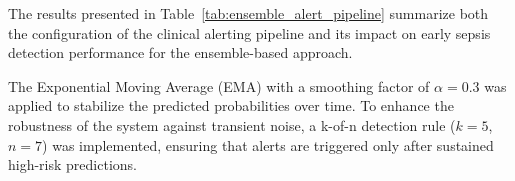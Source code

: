 \documentclass[conference]{IEEEtran}
\begin{document}
\begin{table}[H]
\centering
\caption{Clinical Alerting Pipeline Parameters and Achieved Performance for the Ensemble Model.}
\label{tab:ensemble_alert_pipeline}

\renewcommand{\arraystretch}{1.3}

\end{table}

The results presented in Table~\ref{tab:ensemble_alert_pipeline} summarize both the configuration of the clinical alerting pipeline and its impact on early sepsis detection performance for the ensemble-based approach.

The Exponential Moving Average (EMA) with a smoothing factor of $\alpha = 0.3$ was applied to stabilize the predicted probabilities over time. To enhance the robustness of the system against transient noise, a k-of-n detection rule ($k=5$, $n=7$) was implemented, ensuring that alerts are triggered only after sustained high-risk predictions.
\end{document}
